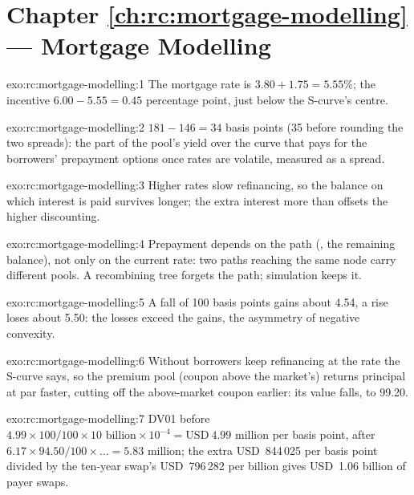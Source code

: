 \section*{Chapter \ref{ch:rc:mortgage-modelling} --- Mortgage Modelling}

\begin{solution}{exo:rc:mortgage-modelling:1}
The mortgage rate is $3.80+1.75 = 5.55\%$; the incentive $6.00-5.55 = 0.45$ percentage point,
just below the S-curve's centre.
\end{solution}

\begin{solution}{exo:rc:mortgage-modelling:2}
$181-146 = 34$ basis points (35 before rounding the two spreads): the part of the pool's
yield over the curve that pays for the borrowers' prepayment options once rates are
volatile, measured as a spread.
\end{solution}

\begin{solution}{exo:rc:mortgage-modelling:3}
Higher rates slow refinancing, so the balance on which interest is paid survives longer;
the extra interest more than offsets the higher discounting.
\end{solution}

\begin{solution}{exo:rc:mortgage-modelling:4}
Prepayment depends on the path (, the remaining balance), not only on the current
rate: two paths reaching the same node carry different pools. A recombining tree forgets
the path; simulation keeps it.
\end{solution}

\begin{solution}{exo:rc:mortgage-modelling:5}
A fall of 100 basis points gains about 4.54, a rise loses about 5.50: the losses exceed the
gains, the asymmetry of negative convexity.
\end{solution}

\begin{solution}{exo:rc:mortgage-modelling:6}
Without  borrowers keep refinancing at the rate the S-curve says, so the premium
pool (coupon above the market's) returns principal at par faster, cutting off the
above-market coupon earlier: its value falls, to 99.20.
\end{solution}

\begin{solution}{exo:rc:mortgage-modelling:7}
DV01 before $4.99\times100/100\times10\text{ billion}\times10^{-4} = \text{USD}~4.99$ million per basis
point, after $6.17\times94.50/100\times\ldots = 5.83$ million; the extra USD~844\,025 per basis
point divided by the ten-year swap's USD~796\,282 per billion gives USD~1.06 billion of
payer swaps.
\end{solution}

